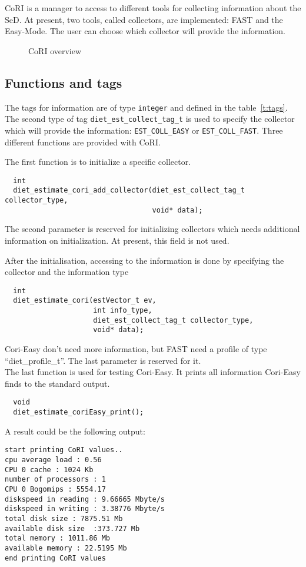 CoRI is a manager to access to different tools for collecting information about the SeD. At present, two tools, called collectors, are implemented: FAST and the Easy-Mode. The user can choose which collector will provide the information.

\begin{figure}[h]
  \begin{center}
    \caption{CoRI overview}
    \label{fig:cori-overview}
  \end{center}
\end{figure}

\subsection{Functions and tags}
The tags for information are of type \texttt{integer} and
defined in the table~\ref{t:tags}. The second type of tag
\texttt{diet\_est\_collect\_tag\_t} is used to specify the collector
which will provide the information: \texttt{EST\_COLL\_EASY} or
\texttt{EST\_COLL\_FAST}. Three different functions are provided
with CoRI.

The first function is to initialize a specific collector.

\footnotesize
\begin{verbatim}
  int
  diet_estimate_cori_add_collector(diet_est_collect_tag_t collector_type,
                                   void* data);
\end{verbatim}
\normalsize
The second parameter is reserved for initializing collectors which needs additional information on  initialization. At present, this field is not used.

After the initialisation, accessing to the information is done by specifying the
collector and the information type
\footnotesize
\begin{verbatim}
  int
  diet_estimate_cori(estVector_t ev,
                     int info_type,
                     diet_est_collect_tag_t collector_type,
                     void* data);
\end{verbatim}
\normalsize 
Cori-Easy don't need more information, but FAST need a
profile of type ``diet\_profile\_t''. The last
parameter is reserved for it. \\
The last function is used for testing Cori-Easy. It
prints all information Cori-Easy finds to the standard output.

\footnotesize
\begin{verbatim}
  void
  diet_estimate_coriEasy_print();
\end{verbatim}
\normalsize
A result could be the following output:
\footnotesize
\begin{verbatim}
start printing CoRI values..
cpu average load : 0.56
CPU 0 cache : 1024 Kb
number of processors : 1
CPU 0 Bogomips : 5554.17
diskspeed in reading : 9.66665 Mbyte/s
diskspeed in writing : 3.38776 Mbyte/s
total disk size : 7875.51 Mb
available disk size  :373.727 Mb
total memory : 1011.86 Mb
available memory : 22.5195 Mb
end printing CoRI values
\end{verbatim}
\normalsize

